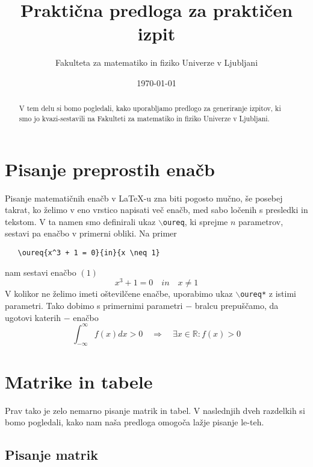 \documentclass[a4paper, 11pt]{article}
\title{Praktična predloga za praktičen izpit}
\author{Fakulteta za matematiko in fiziko Univerze v Ljubljani}
\date{\today}
\newcommand{\R}[1]{\texttt{#1}}
\begin{document}
\maketitle
\begin{abstract}
   V tem delu si bomo pogledali, kako uporabljamo predlogo za generiranje izpitov,
   ki smo jo kvazi-sestavili na Fakulteti za matematiko in fiziko Univerze v Ljubljani.
\end{abstract}
   

\tableofcontents

\section{Pisanje preprostih enačb}

Pisanje matematičnih enačb v {\LaTeX}-u zna biti pogosto mučno, še posebej takrat,
ko želimo v eno vrstico napisati več enačb, med sabo ločenih s presledki in tekstom.
V ta namen smo definirali ukaz $\backslash$\R{oureq}, ki sprejme $n$ parametrov,
sestavi pa enačbo v primerni obliki. Na primer
\begin{verbatim}
   \oureq{x^3 + 1 = 0}{in}{x \neq 1}
\end{verbatim}
   
nam sestavi enačbo $(1)$
\begin{equation}
   x^3 + 1 = 0 \quad in \quad x \neq 1
\end{equation}
V kolikor ne želimo imeti oštevilčene enačbe, uporabimo ukaz $\backslash$\R{oureq*}
z istimi parametri. Tako dobimo s primernimi parametri $-$ bralcu prepuščamo,
da ugotovi katerih $-$ enačbo
\[ \int_{-\infty}^{\infty} f(x)dx > 0 \quad \Rightarrow \quad \exists x \in \mathbb{R} : f(x) > 0      \]


\section{Matrike in tabele}

Prav tako je zelo nemarno pisanje matrik in tabel. V naslednjih dveh razdelkih
si bomo pogledali, kako nam naša predloga omogoča lažje pisanje le-teh.

\subsection{Pisanje matrik}
\end{document}
